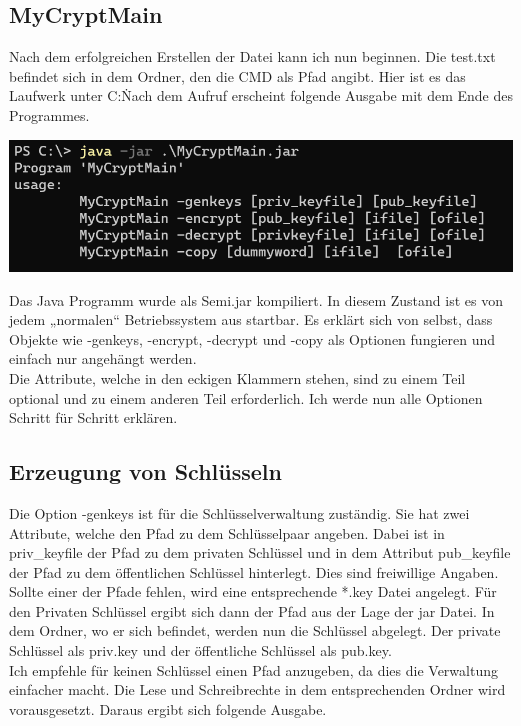 \subsection{MyCryptMain}
Nach dem erfolgreichen Erstellen der Datei kann ich nun beginnen. Die test.txt befindet sich in dem Ordner, den die CMD als Pfad angibt. Hier ist es das Laufwerk unter C:\.
Nach dem Aufruf erscheint folgende Ausgabe mit dem Ende des Programmes.
\begin{center}
	\includegraphics{./img/basic}
\end{center}
Das Java Programm wurde als Semi.jar kompiliert. In diesem Zustand ist es von jedem „normalen“ Betriebssystem aus startbar. Es erklärt sich von selbst, dass Objekte wie -genkeys, -encrypt, -decrypt und -copy als Optionen fungieren und einfach nur angehängt werden. \\
Die Attribute, welche in den eckigen Klammern stehen, sind zu einem Teil optional und zu einem anderen Teil erforderlich. Ich werde nun alle Optionen Schritt für Schritt erklären.

\subsection{Erzeugung von Schlüsseln}
Die Option -genkeys ist für die Schlüsselverwaltung zuständig. Sie hat zwei Attribute, welche den Pfad zu dem Schlüsselpaar angeben. Dabei ist in priv\_keyfile der Pfad zu dem privaten Schlüssel und in dem Attribut pub\_keyfile der Pfad zu dem öffentlichen Schlüssel hinterlegt. Dies sind freiwillige Angaben. Sollte einer der Pfade fehlen, wird eine entsprechende *.key Datei angelegt. Für den Privaten Schlüssel ergibt sich dann der Pfad aus der Lage der jar Datei. In dem Ordner, wo er sich befindet, werden nun die Schlüssel abgelegt. Der private Schlüssel als priv.key und der öffentliche Schlüssel als pub.key.\\ Ich empfehle für keinen Schlüssel einen Pfad anzugeben, da dies die Verwaltung einfacher macht. Die Lese und Schreibrechte in dem entsprechenden Ordner wird vorausgesetzt. Daraus ergibt sich folgende Ausgabe.\\

